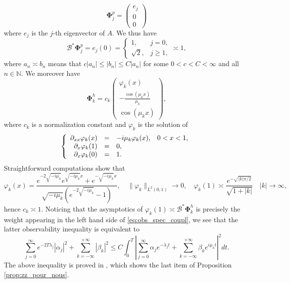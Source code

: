 \documentclass[10pt]{article}
\begin{document}
\[
\mathbf{\Phi}_j^p = \left( \begin{array}{c}
    e_j  \\
    0 \\
    0
\end{array}\right)
\]
where $e_j$ is the $j$-th eigenvector of $A$. We thus have 
\[
\mathcal{B}^* \mathbf{\Phi}_j^p = e_j(0) = \left\lbrace \begin{array}{ccc}
    1, & j = 0, \\
    \sqrt{2}, & j \geq 1, 
\end{array}\right. \asymp 1,
\]
where $a_n \asymp b_n$ means that $c|a_n| \leq |b_n| \leq C |a_n|$ for some $0 < c < C < \infty$ and all $n \in \mathbb{N}$. We moreover have 
\[
\mathbf{\Phi}_k^h = c_k \left( \begin{array}{c}
    \varphi_k(x)  \\
    - \frac{\cos(\mu_kx)}{\mu_k} \\
    \cos(\mu_k x)
\end{array}\right),
\]
where $c_k$ is a normalization constant and $\varphi_k$ is the solution of 
\[
\left\lbrace \begin{array}{rcl cc}
    \partial_{xx} \varphi_k(x) &=& -i\mu_k \varphi_k(x),& 0 < x < 1,  \\
    \partial_x \varphi_k(1) &=& 0,\\
    \partial_x \varphi_k(0) &=& 1.
\end{array}\right.
\]
Straightforward computations show that 
\begin{equation}\label{eq:estimate_obs_hyp}
    \varphi_k(x) = \frac{e^{-2 \sqrt{-i\mu_k}} e^{\sqrt{-i\mu_k}x} + e^{-\sqrt{-i\mu_k}x}}{\sqrt{-i\mu_k}(e^{-2\sqrt{-i\mu_k}} - 1)}, \quad \| \varphi_k \|_{L^2(0,1)} \rightarrow 0,\quad \varphi_k(1) \asymp \frac{e^{-\sqrt{|k|\pi/2}}}{\sqrt{1+|k|}} \quad |k| \to \infty,
\end{equation}
hence $c_k \asymp 1$. Noticing that the asymptotics of $\varphi_k(1) \asymp \mathcal{B}^*\mathbf{\Phi}_k^h$ is precisely the weight appearing in the left hand side of \eqref{eq:obs_spec_coupl}, we see that the latter observability inequality is equivalent to 
\[
\sum_{j = 0}^\infty e^{-2T \lambda_j}|\alpha_j|^2 + \sum_{k=-\infty}^{+\infty} \left| \beta_k \right|^2 \leq C \int_0^T \left| \sum_{j = 0}^\infty \alpha_j e^{-\lambda_j t}  + \sum_{k = -\infty
}^{+\infty} \beta_k e^{i\mu_kt} \right|^2 dt.
\]
The above inequality is proved in \cite[Proposition 1.8]{chowdhury}, which shows the last item of Proposition \ref{prop:zz_pour_nous}. 
\newline
\end{document}
